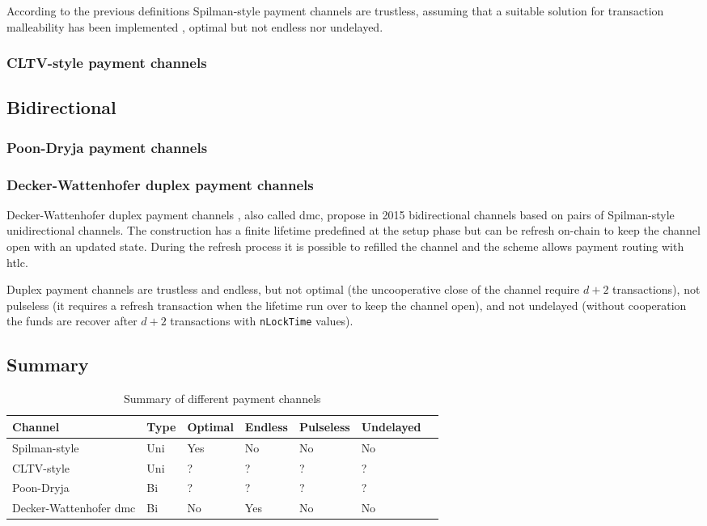 According to the previous definitions Spilman-style payment channels are trustless,
assuming that a suitable solution for transaction malleability has been implemented
\cite{BIP62, DBLP:journals/corr/AndrychowiczDMM13, DBLP:journals/corr/DeckerW14},
optimal but not endless nor undelayed.

\subsubsection{CLTV-style payment channels}

\subsection{Bidirectional}

\subsubsection{Poon-Dryja payment channels}

\subsubsection{Decker-Wattenhofer duplex payment channels}

Decker-Wattenhofer duplex payment channels \cite{Decker2015fast}, also called
\gls{dmc}, propose in 2015 bidirectional channels based on pairs of Spilman-style
unidirectional channels. The construction has a finite lifetime predefined at the setup
phase but can be refresh on-chain to keep the channel open with an updated state. During the
refresh process it is possible to refilled the channel and the scheme allows payment routing
with \gls{htlc}.

Duplex payment channels are trustless and endless, but not optimal (the uncooperative close of the
channel require $d + 2$ transactions), not pulseless (it requires a refresh transaction
when the lifetime run over to keep the channel open), and not undelayed (without cooperation
the funds are recover after $d + 2$ transactions with \texttt{nLockTime} values).

\subsection{Summary}

\begin{table}[h]
  \begin{tabularx}{\textwidth}{ | X | l | l | l | l | l | l |}
  \hline
  Channel & Type & Optimal & Endless & Pulseless & Undelayed \\ \hline
  Spilman-style & Uni & Yes & No & No & No \\ \hline
  CLTV-style & Uni & ? & ? & ? & ? \\ \hline
  Poon-Dryja & Bi & ? & ? & ? & ? \\ \hline
  Decker-Wattenhofer \gls{dmc} & Bi & No & Yes & No & No \\
  \hline
  \end{tabularx}
  \caption{Summary of different payment channels}
  \label{fig:summaryPaymentChannel}
\end{table}

